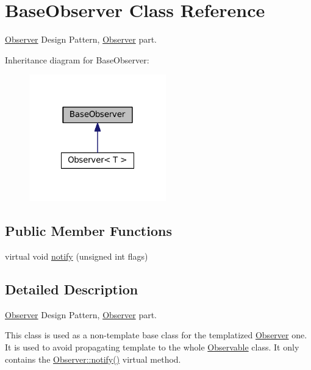 \hypertarget{classKatabatic_1_1BaseObserver}{}\section{Base\+Observer Class Reference}
\label{classKatabatic_1_1BaseObserver}


\mbox{\hyperlink{classKatabatic_1_1Observer}{Observer}} Design Pattern, \mbox{\hyperlink{classKatabatic_1_1Observer}{Observer}} part.  




Inheritance diagram for Base\+Observer\+:\nopagebreak
\begin{figure}[H]
\begin{center}
\leavevmode
\includegraphics[width=168pt]{classKatabatic_1_1BaseObserver__inherit__graph}
\end{center}
\end{figure}
\subsection*{Public Member Functions}
\begin{DoxyCompactItemize}
\item 
virtual void \mbox{\hyperlink{classKatabatic_1_1BaseObserver_a52e577fb0c4f2e3650928334fb621c2f}{notify}} (unsigned int flags)
\end{DoxyCompactItemize}


\subsection{Detailed Description}
\mbox{\hyperlink{classKatabatic_1_1Observer}{Observer}} Design Pattern, \mbox{\hyperlink{classKatabatic_1_1Observer}{Observer}} part. 

This class is used as a non-\/template base class for the templatized \mbox{\hyperlink{classKatabatic_1_1Observer}{Observer}} one. It is used to avoid propagating template to the whole \mbox{\hyperlink{classKatabatic_1_1Observable}{Observable}} class. It only contains the \mbox{\hyperlink{classKatabatic_1_1BaseObserver_a52e577fb0c4f2e3650928334fb621c2f}{Observer\+::notify()}} virtual method. 

